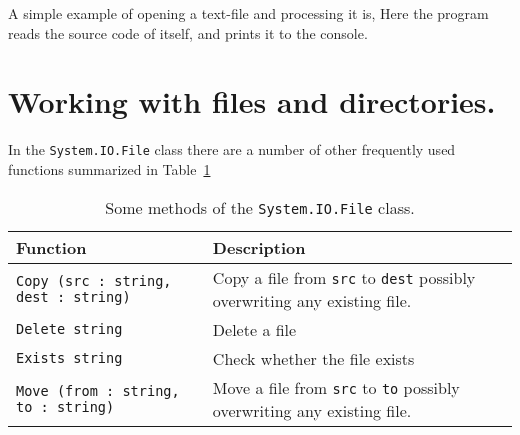 A simple example of opening a text-file and processing it is,
%
%
Here the program reads the source code of itself, and prints it to the console.

\section{Working with files and directories.}
In the \lstinline!System.IO.File! class there are a number of other frequently used functions summarized in Table~\ref{tab:File.Others}
\begin{table}
  \begin{center}
    \begin{tabularx}{\linewidth}{|l|X|}
      \hline
      Function & Description\\
      \hline
      \lstinline{Copy (src : string, dest : string)} & Copy a file from \lstinline{src} to \lstinline{dest} possibly overwriting any existing file.\\
      \hline
      \lstinline{Delete string} & Delete a file\\
      \hline
      \lstinline{Exists string} & Check whether the file exists\\
      \hline
      \lstinline{Move (from : string, to : string)} & Move a file from \lstinline{src} to \lstinline{to} possibly overwriting any existing file.\\
      \hline
    \end{tabularx}
  \end{center}
  \caption{Some methods of the \lstinline!System.IO.File! class.}
  \label{tab:File.Others}
\end{table}

